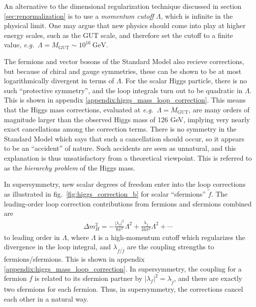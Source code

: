 \documentclass[twoside,english]{uiofysmaster}
\begin{document}
An alternative to the dimensional regularization technique discussed in section \ref{sec:renormalization} is to use a {\it momentum cutoff} $\Lambda$, which is infinite in the physical limit. One may argue that new physics should come into play at higher energy scales, such as the GUT scale, and therefore set the cutoff to a finite value, {\it e.g.}\ $\Lambda = M_{\mathrm{GUT}} \sim 10^{16}~\mathrm{GeV}$.

The fermions and vector bosons of the Standard Model also recieve corrections, but because of chiral and gauge symmetries, these can be shown to be at most logarithmically divergent in terms of $\Lambda$. For the scalar Higgs particle, there is no such ``protective symmetry'', and the loop integrals turn out to be quadratic in $\Lambda$. This is shown in appendix \ref{appendix:higgs_mass_loop_correction}. This means that the Higgs mass corrections, evaluated at {\it e.g.}\ $\Lambda = M_{\mathrm{GUT}}$, are many orders of magnitude larger than the observed Higgs mass of 126 GeV, implying very nearly exact cancellations among the correction terms. There is no symmetry in the Standard Model which says that such a cancellation should occur, so it appears to be an ``accident'' of nature. Such accidents are seen as unnatural, and this explanation is thus unsatisfactory from a theoretical viewpoint. This is referred to as the {\it hierarchy problem} of the Higgs mass. 

In supersymmetry, new scalar degrees of freedom enter into the loop corrections as illustrated in fig.\ \ref{fig:higgs_correction_b} for scalar ``sfermions'' $\tilde f$. The leading-order loop correction contributions from fermions and sfermions combined are 
\begin{align}
	\Delta m_H^2 = -\frac{|\lambda_f|^2}{8\pi^2}\Lambda^2 + \frac{\lambda_{\tilde f}}{16\pi^2}\Lambda^2 + \cdots\label{eq:higgs_mass_corrections}
\end{align}
to leading order in $\Lambda$, where $\Lambda$ is a high-momentum cutoff which regularizes the divergence in the loop integral, and $\lambda_{f/\tilde f}$ are the coupling strengths to fermions/sfermions. This is shown in appendix \ref{appendix:higgs_mass_loop_correction}. In supersymmetry, the coupling for a fermion $f$ is related to its sfermion partner by $|\lambda_f|^2 = \lambda_{\tilde f}$, and there are exactly two sfermions for each fermion. Thus, in supersymmetry, the corrections cancel each other in a natural way.
\end{document}
